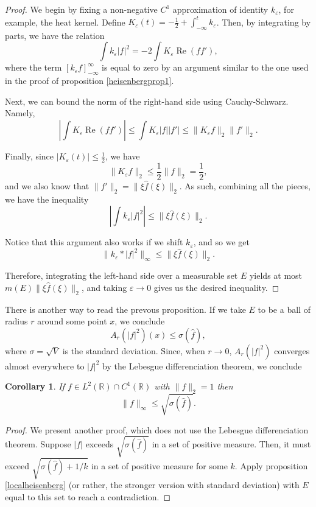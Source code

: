 \documentclass{amsart}
\newcommand{\R}{\mathbb{R}}
\DeclareMathOperator{\re}{Re}
\newtheorem{cor}{Corollary}[prop]
\begin{document}
\begin{proof}
We begin by fixing a non-negative $C^1$ approximation of identity $k_\varepsilon$, for example, the heat kernel. Define $K_\varepsilon(t) = -\frac12 + \int_{-\infty}^t k_\varepsilon$. Then, by integrating by parts, we have the relation
\[\int k_\varepsilon \lvert f \rvert^2 = - 2 \int K_\varepsilon \re(f f'),\]
where the term $\left[ k_\varepsilon f \right]_{-\infty}^\infty$ is equal to zero by an argument similar to the one used in the proof of proposition \ref{heisenbergprop1}.

Next, we can bound the norm of the right-hand side using Cauchy-Schwarz. Namely,
\[\left\lvert \int K_\varepsilon  \re(f f') \right \rvert \leq \int K_\varepsilon \lvert f \rvert \lvert f' \rvert \leq \lVert K_\varepsilon f \rVert_2 \lVert f' \rVert_2.\]

Finally, since $\lvert K_\varepsilon(t) \rvert \leq \frac12$, we have
\[\lVert K_\varepsilon f \rVert_2 \leq \frac12 \lVert f \rVert_2 = \frac12,\]
and we also know that $\lVert f' \rVert_2 = \lVert \xi \hat f(\xi) \rVert_2$. As such, combining all the pieces, we have the inequality
\[\left\lvert \int k_\varepsilon \lvert f \rvert^2 \right\rvert \leq \lVert \xi \hat f(\xi) \rVert_2.\]

Notice that this argument also works if we shift $k_\varepsilon$, and so we get
\[\lVert k_\varepsilon * \lvert f \rvert^2 \rVert_\infty \leq \lVert \xi \hat f(\xi) \rVert_2.\]

Therefore, integrating the left-hand side over a measurable set $E$ yields at most $m(E) \lVert \xi \hat f(\xi) \rVert_2$, and taking $\varepsilon \to 0$ gives us the desired inequality.
\end{proof}

There is another way to read the prevous proposition. If we take $E$ to be a ball of radius $r$ around some point $x$, we conclude
\[A_r(\lvert f \rvert^2)(x) \leq \sigma(\hat f),\]
where $\sigma = \sqrt V$ is the standard deviation. Since, when $r \to 0$, $A_r(\lvert f \rvert^2)$ converges almost everywhere to $\lvert f \rvert^2$ by the Lebesgue differenciation theorem, we conclude

\begin{cor}
If $f \in L^2(\R) \cap C^1(\R)$ with $\lVert f \rVert_2 = 1$ then
\[\lVert f \rVert_\infty \leq \sqrt{\sigma(\hat f)}.\]
\end{cor}

\begin{proof}
We present another proof, which does not use the Lebesgue differenciation theorem. Suppose $\lvert f \rvert$ exceeds $\sqrt{\sigma(\hat f)}$ in a set of positive measure. Then, it must exceed $\sqrt{\sigma(\hat f) + 1/k}$ in a set of positive measure for some $k$. Apply proposition \ref{localheisenberg} (or rather, the stronger version with standard deviation) with $E$ equal to this set to reach a contradiction.
\end{proof}
\end{document}
